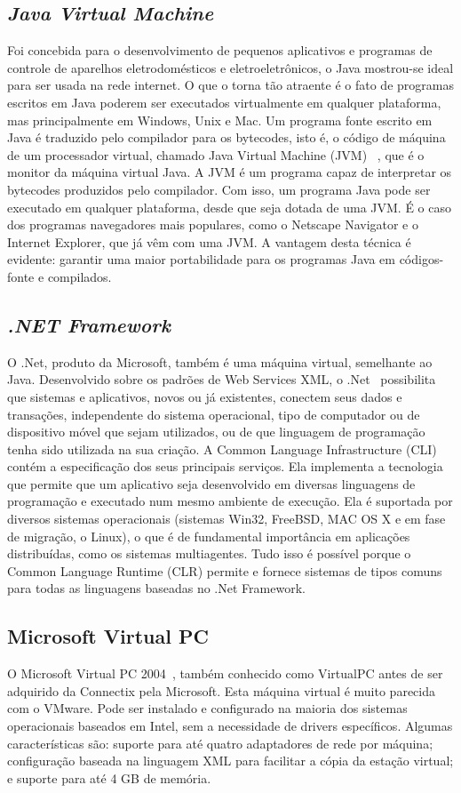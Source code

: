 \subsection{\emph{Java Virtual Machine}}
Foi concebida para o desenvolvimento de pequenos aplicativos e
programas de controle de aparelhos eletrodomésticos e eletroeletrônicos, o Java mostrou-se ideal
para ser usada na rede internet. O que o torna tão atraente é o fato de programas escritos em Java
poderem ser executados virtualmente em qualquer plataforma, mas principalmente em Windows,
Unix e Mac.
Um programa fonte escrito em Java é traduzido pelo compilador para os bytecodes, isto é, o
código de máquina de um processador virtual, chamado Java Virtual Machine (JVM)~\cite{raitz} , que é o
monitor da máquina virtual Java.
A JVM é um programa capaz de interpretar os bytecodes produzidos pelo compilador. Com
isso, um programa Java pode ser executado em qualquer plataforma, desde que seja dotada de uma
JVM. É o caso dos programas navegadores mais populares, como o Netscape Navigator e o
Internet Explorer, que já vêm com uma JVM. A vantagem desta técnica é evidente: garantir uma
maior portabilidade para os programas Java em códigos-fonte e compilados.

\subsection{\emph{.NET Framework}}
O .Net, produto da Microsoft, também é uma máquina virtual, semelhante ao Java.
Desenvolvido sobre os padrões de Web Services XML, o .Net~\cite{raitz} possibilita que sistemas e
aplicativos, novos ou já existentes, conectem seus dados e transações, independente do sistema
operacional, tipo de computador ou de dispositivo móvel que sejam utilizados, ou de que
linguagem de programação tenha sido utilizada na sua criação.
A Common Language Infrastructure (CLI) contém a especificação dos seus principais
serviços. Ela implementa a tecnologia que permite que um aplicativo seja desenvolvido em
diversas linguagens de programação e executado num mesmo ambiente de execução. Ela é
suportada por diversos sistemas operacionais (sistemas Win32, FreeBSD, MAC OS X e em fase de
migração, o Linux), o que é de fundamental importância em aplicações distribuídas, como os
sistemas multiagentes.
Tudo isso é possível porque o Common Language Runtime (CLR) permite e fornece sistemas
de tipos comuns para todas as linguagens baseadas no .Net Framework.

\subsection{Microsoft Virtual PC}
O Microsoft Virtual PC 2004~\cite{raitz}, também conhecido como VirtualPC antes de ser adquirido da
Connectix pela Microsoft. Esta máquina virtual é muito parecida com o VMware. Pode ser
instalado e configurado na maioria dos sistemas operacionais baseados em Intel, sem a
necessidade de drivers específicos.
Algumas características são: suporte para até quatro adaptadores de rede por máquina;
configuração baseada na linguagem XML para facilitar a cópia da estação virtual; e suporte para
até 4 GB de memória.

